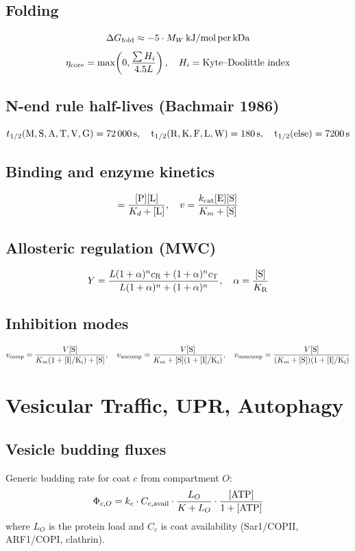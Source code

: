 \documentclass[11pt,a4paper]{article}
\newcommand{\eq}[1]{\begin{equation}#1\end{equation}}
\begin{document}
\subsection{Folding}
\eq{ \Delta G_{\rm fold}\approx -5\cdot M_W\,{\rm kJ/mol\,per\,kDa} }
\eq{ \eta_{\rm core}=\max\!\left(0,\frac{\sum H_i}{4.5 L}\right),\quad H_i=\text{Kyte--Doolittle index} }

\subsection{N-end rule half-lives (Bachmair 1986)}
\[ t_{1/2}(\rm M,S,A,T,V,G)=\SI{72000}{s},\quad t_{1/2}(\rm R,K,F,L,W)=\SI{180}{s},\quad t_{1/2}(\text{else})=\SI{7200}{s} \]

\subsection{Binding and enzyme kinetics}
\eq{ [\rm PL]=\frac{[\rm P][\rm L]}{K_d+[\rm L]},\quad v=\frac{k_{\rm cat}[\rm E][\rm S]}{K_m+[\rm S]} }

\subsection{Allosteric regulation (MWC)}
\eq{ Y = \frac{L(1+\alpha)^n c_{\rm R} + (1+\alpha)^n c_{\rm T}}{L(1+\alpha)^n + (1+\alpha)^n},\quad \alpha=\frac{[\rm S]}{K_{\rm R}} }

\subsection{Inhibition modes}
\[
v_{\rm comp}=\frac{V[\rm S]}{K_m(1+[\rm I]/K_i)+[\rm S]},\quad v_{\rm uncomp}=\frac{V[\rm S]}{K_m+[\rm S](1+[\rm I]/K_i)},\quad v_{\rm noncomp}=\frac{V[\rm S]}{(K_m+[\rm S])(1+[\rm I]/K_i)}
\]

\clearpage
\section{Vesicular Traffic, UPR, Autophagy}
\label{sec:vesicles}

\subsection{Vesicle budding fluxes}
Generic budding rate for coat $c$ from compartment $O$:
\eq{ \Phi_{c,O} = k_c\cdot C_{c,{\rm avail}}\cdot\frac{L_O}{K+L_O}\cdot\frac{[\rm ATP]}{1+[\rm ATP]} }
where $L_O$ is the protein load and $C_c$ is coat availability (Sar1/COPII, ARF1/COPI, clathrin).
\end{document}
